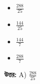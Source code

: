 \documentclass[12pt, a4paper]{article}
\begin{document}
\begin{itemize}[label={}, leftmargin=1cm, itemsep=0.5em]
    \item[\textbf{A)}] $\frac{288}{25}$
    \item[\textbf{B)}] $\frac{144}{25}$
    \item[\textbf{C)}] $\frac{144}{7}$
    \item[\textbf{D)}] $\frac{288}{7}$
\end{itemize}

\vspace{0.5em}
\begin{tcolorbox}[answerbox]
    \textbf{\color{success} উত্তর:} A) $\frac{288}{25}$
\end{tcolorbox}
\vspace{1em}
\end{document}
